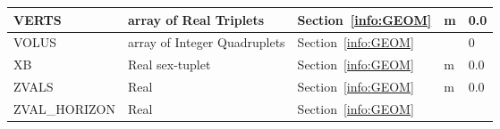 \documentclass[12pt]{article}
\begin{document}
\begin{longtable}{@{\extracolsep{\fill}}|l|l|l|l|l|}
{\ct VERTS}        & array of Real Triplets & Section~\ref{info:GEOM}            &   m       &   0.0                    \\ \hline
{\ct VOLUS}        & array of Integer Quadruplets     & Section~\ref{info:GEOM}  &           &    0                     \\ \hline
{\ct XB}           & Real sex-tuplet        & Section~\ref{info:GEOM}            &   m       &   0.0                    \\ \hline
{\ct ZVALS}        & Real                   & Section~\ref{info:GEOM}            &   m     &   0.0                    \\ \hline
{\ct ZVAL\_HORIZON}        & Real                   & Section~\ref{info:GEOM}    &      &                    \\ \hline



\end{longtable}
\end{document}
